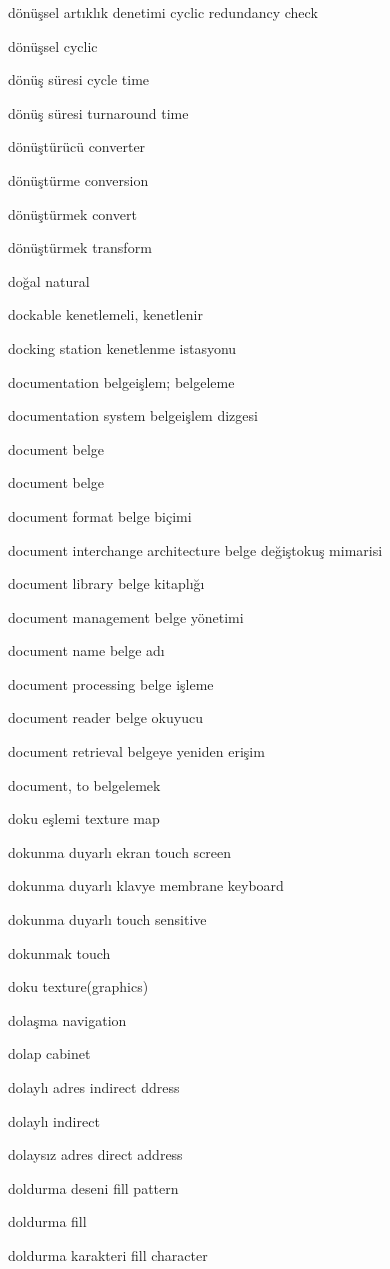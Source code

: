 \documentclass[12pt,fleqn]{article}\usepackage{../../common}
\begin{document}
dönüşsel artıklık denetimi cyclic redundancy check

dönüşsel cyclic

dönüş süresi cycle time

dönüş süresi turnaround time

dönüştürücü converter

dönüştürme conversion

dönüştürmek convert

dönüştürmek transform

doğal natural

dockable kenetlemeli, kenetlenir

docking station kenetlenme istasyonu

documentation belgeişlem; belgeleme

documentation system belgeişlem dizgesi

document belge

document belge

document format belge biçimi

document interchange architecture belge değiştokuş mimarisi

document library belge kitaplığı

document management belge yönetimi

document name belge adı

document processing belge işleme

document reader belge okuyucu

document retrieval belgeye yeniden erişim

document, to belgelemek

doku eşlemi texture map

dokunma duyarlı ekran touch screen

dokunma duyarlı klavye membrane keyboard

dokunma duyarlı touch sensitive

dokunmak touch

doku texture(graphics)

dolaşma navigation

dolap cabinet

dolaylı adres indirect ddress

dolaylı indirect

dolaysız adres direct address

doldurma deseni fill pattern

doldurma fill

doldurma karakteri fill character
\end{document}
